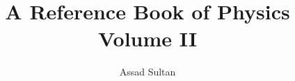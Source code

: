 \documentclass[a4paper,12pt]{pieasthesis}
\title{A Reference Book of Physics \\ Volume II}
\author{Assad Sultan}
\begin{document}
\makefrontmatter











\addappheadtotoc
% 
% 
% 
% 
% 
\end{document}

